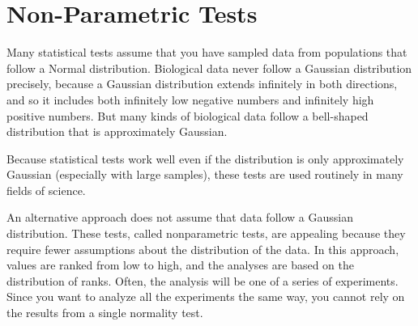 \section{Non-Parametric Tests}
Many statistical tests assume that you have sampled data from populations that follow a Normal distribution. 
Biological data never follow a Gaussian distribution precisely, because a Gaussian distribution extends infinitely in both directions, and so it includes both infinitely low negative numbers and infinitely high positive numbers. But many kinds of biological data follow a bell-shaped distribution that is approximately Gaussian. 

Because statistical tests work well even if the distribution is only approximately Gaussian (especially with large samples), these tests are used routinely in many fields of science.

An alternative approach does not assume that data follow a Gaussian distribution. These tests, called nonparametric tests, are appealing because they require fewer assumptions about the distribution of the data. In this approach, values are ranked from low to high, and the analyses are based on the distribution of ranks.
Often, the analysis will be one of a series of experiments. Since you want to analyze all the experiments the same way, you cannot rely on the results from a single normality test.
